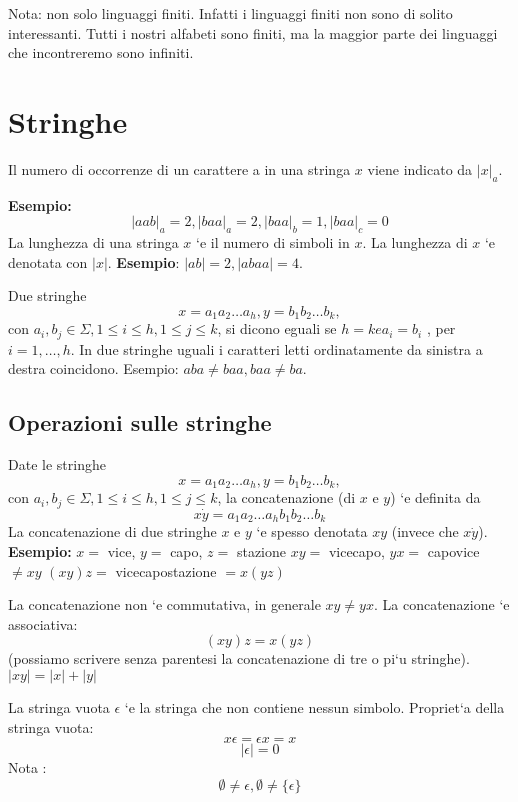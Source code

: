Nota: non solo linguaggi finiti.
Infatti i linguaggi finiti non sono di solito interessanti.
Tutti i nostri alfabeti sono finiti, ma la maggior parte dei
linguaggi che incontreremo sono infiniti.

\section{Stringhe}
Il numero di occorrenze di un carattere a in una stringa \(x\)
viene indicato da \(|x|_a\).
\vspace{5mm}

\textbf{Esempio:}
\[|aab|_a = 2, |baa|_a = 2, |baa|_b = 1, |baa|_c = 0\]
La lunghezza di una stringa \(x\) `e il numero di simboli in \(x\).
La lunghezza di \(x\) `e denotata con \(|x|\).
\textbf{Esempio}: \(|ab| = 2, |abaa| = 4\).

Due stringhe
\[x = a_{1}a_{2} \dots a_{h}, y = b_{1}b_{2} \dots b_{k} ,\]
con \(a_{i}, b_{j} \in \Sigma, 1 \leq i \leq h, 1 \leq j \leq k\), si dicono eguali se \(h = k e a_i = b_i\)
, per \(i = 1, \dots , h\).
In due stringhe uguali i caratteri letti ordinatamente da
sinistra a destra coincidono.
Esempio: \(aba \neq baa, baa \neq ba\).

\subsection{Operazioni sulle stringhe}
Date le stringhe
\[x = a_{1}a_{2} \dots a_{h}, y = b_{1}b_{2} \dots b_k ,\]
con \(a_i, b_j \in \Sigma, 1 \leq i \leq h, 1 \leq j \leq k\), la concatenazione (di
\(x\) e \(y\)) `e definita da
\[x \dot y = a_{1}a_{2} \dots a_{h}b_{1}b_{2} \dots b_{k}\]
La concatenazione di due stringhe \(x\) e \(y\) `e spesso denotata \(xy\)
(invece che \(x \dot y\)).
\vspace{5mm}
\textbf{Esempio:} \(x =\) vice, \(y =\) capo, \(z =\) stazione \(xy =\) vicecapo,
\(yx =\) capovice \(\neq xy\)
\((xy)z =\) vicecapostazione \(= x(yz)\)

La concatenazione non `e commutativa, in generale \(xy \neq  yx\).
La concatenazione `e associativa:
\[(xy)z = x(yz)\]
(possiamo scrivere senza parentesi la concatenazione di tre o
pi`u stringhe).
\(|xy| = |x| + |y|\)

La stringa vuota \(\epsilon\) `e la stringa che non contiene nessun
simbolo.
Propriet`a della stringa vuota:
\[x \epsilon = \epsilon x = x\]
\[|\epsilon| = 0\]
Nota :
\[\emptyset \neq \epsilon, \emptyset \neq \{\epsilon\}\]

